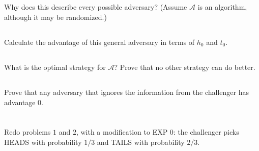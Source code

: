 \documentclass[12pt]{article}
\begin{document}
\subsection{}
Why does this describe every possible adversary? (Assume $\mathcal{A}$ is an algorithm, although it may be randomized.)

\subsection{}
Calculate the advantage of this general adversary in terms of $h_0$ and $t_0$.

\subsection{}
What is the optimal strategy for $\mathcal{A}$? Prove that no other strategy can do better.


\subsection{}

Prove that any adversary that ignores the information from the challenger has advantage $0$.

\newpage 
\section{}

\subsection{}

Redo problems $1$ and $2$, with a modification to EXP $0$: the challenger picks HEADS with probability $1/3$ and TAILS with probability $2/3$.


\subsection{}
\end{document}
